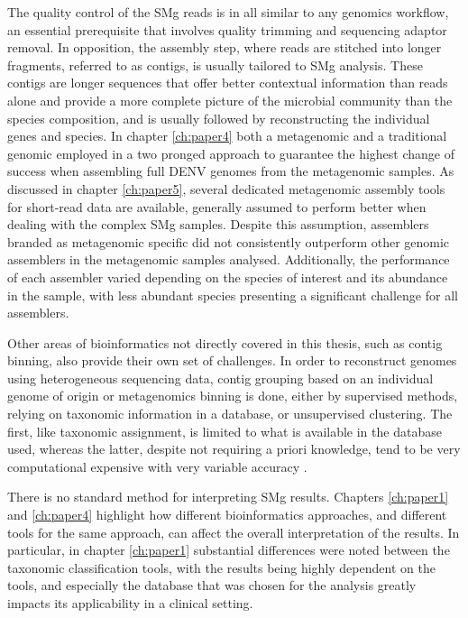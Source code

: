 The quality control of the \ac{SMg} reads is in all similar to any genomics workflow,  an essential prerequisite that involves quality trimming and sequencing adaptor removal. In opposition, the assembly step, where reads are stitched into longer fragments, referred to as contigs, is usually tailored to \ac{SMg} analysis. These contigs are longer sequences that offer better contextual information than reads alone and provide a more complete picture of the microbial community than the species composition, and is usually followed by reconstructing the individual genes and species. In chapter \ref{ch:paper4} both a metagenomic and a traditional genomic employed in a two pronged approach to guarantee the highest change of success when assembling full \ac{DENV} genomes from the metagenomic samples. As discussed in chapter \ref{ch:paper5}, several dedicated metagenomic assembly tools for short-read data are available, generally assumed to perform better when dealing with the complex \ac{SMg} samples. Despite this assumption, assemblers branded as metagenomic specific did not consistently outperform other genomic assemblers in the metagenomic samples analysed. Additionally, the performance of each assembler varied depending on the species of interest and its abundance in the sample, with less abundant species presenting a significant challenge for all assemblers.

Other areas of bioinformatics not directly covered in this thesis, such as contig binning, also provide their own set of challenges. In order to reconstruct genomes using heterogeneous sequencing data, contig grouping based on an individual genome of origin or metagenomics binning is done, either by supervised methods, relying on taxonomic information in a database, or unsupervised clustering. The first, like taxonomic assignment, is limited  to what is available in the database used, whereas the latter, despite not requiring a priori knowledge, tend to be very computational expensive with very variable accuracy   \citep{bharti_current_2021}. 

There is no standard method for interpreting \ac{SMg} results. Chapters \ref{ch:paper1} and \ref{ch:paper4} highlight how different bioinformatics approaches, and different tools for the same approach, can affect the overall interpretation of the results. In particular, in chapter \ref{ch:paper1} substantial differences were noted between the taxonomic classification tools, with the results being highly dependent on the tools, and especially the database that was chosen for the analysis greatly impacts its applicability in a clinical setting. 

